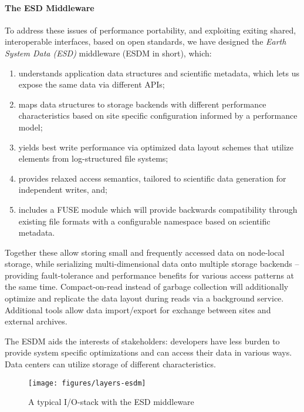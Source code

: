 \paragraph {The ESD Middleware}
To address these issues of performance portability, and exploiting exiting shared, interoperable interfaces, based on open standards, we have designed the \textit{Earth System Data (ESD)} middleware (ESDM in short), which:
\begin{enumerate}
	\item understands application data structures and scientific metadata, which lets us expose the same data via different APIs;
	\item maps data structures to storage backends with different performance characteristics based on site specific configuration informed by a performance model;
	\item yields best write performance via optimized data layout schemes that utilize elements from log-structured file systems;
	\item provides relaxed access semantics, tailored to scientific data generation for independent writes, and;
	\item includes a FUSE module which will provide backwards compatibility through existing file formats with a configurable namespace based on scientific metadata.
\end{enumerate}

Together these allow storing small and frequently accessed data on node-local storage, while serializing multi-dimensional data onto multiple storage backends -- providing fault-tolerance and performance benefits for various access patterns at the same time.
Compact-on-read instead of garbage collection will additionally optimize and replicate the data layout during reads via a background service.
Additional tools allow data import/export for exchange between sites and external archives.

The ESDM aids the interests of stakeholders: developers have less burden to provide system specific optimizations and can access their data in various ways.
Data centers can utilize storage of different characteristics.

\bigskip


\begin{figure}[bp]
	\centering
	\texttt{[image: figures/layers-esdm]}
	\caption{A typical I/O-stack with the ESD middleware}
	\label{fig:architecture-esd-layering}
\end{figure}

